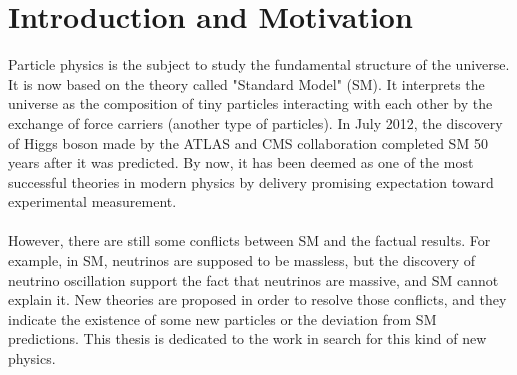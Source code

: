 \chapter{Introduction and Motivation}
Particle physics is the subject to study the fundamental structure of the universe. It is now based on the theory called "Standard Model" (SM). It interprets the universe as the composition of tiny particles interacting with each other by the exchange of force carriers (another type of particles).  In July 2012, the discovery of Higgs boson made by the ATLAS and CMS collaboration completed SM 50 years after it was predicted. By now, it has been deemed as one of the most successful theories in modern physics by delivery promising expectation toward experimental measurement. 
\\
\\
However, there are still some conflicts between SM and the factual results. For example, in SM, neutrinos are supposed to be massless, but the discovery of neutrino oscillation support the fact that neutrinos are massive, and SM cannot explain it. New theories are proposed in order to resolve those conflicts, and they indicate the existence of some new particles or the deviation from SM predictions. This thesis is dedicated to the work in search for this kind of new physics.  
